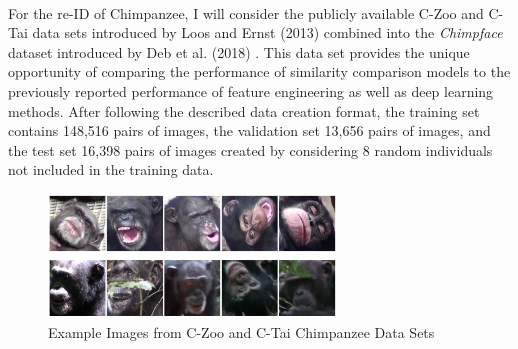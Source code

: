 \documentclass[11pt]{article}
\begin{document}
\newline
\\
For the re-ID of Chimpanzee, I will consider the publicly available C-Zoo and C-Tai data sets introduced by Loos and Ernst (2013) combined into the \textit{Chimpface} dataset introduced by Deb et al. (2018) \cite{loos2013automated, deb2018face}. This data set provides the unique opportunity of comparing the performance of similarity comparison models to the previously reported performance of feature engineering as well as deep learning methods. After following the described data creation format, the training set contains 148,516 pairs of images, the validation set 13,656 pairs of images, and the test set 16,398 pairs of images created by considering 8 random individuals not included in the training data.  
\newline

\begin{figure}
  \begin{flushright}
    \includegraphics[width=3in]{ChimpanzeeExamples.png}
  \end{flushright}
  \caption{Example Images from C-Zoo and C-Tai Chimpanzee Data Sets}
\end{figure}
\end{document}
